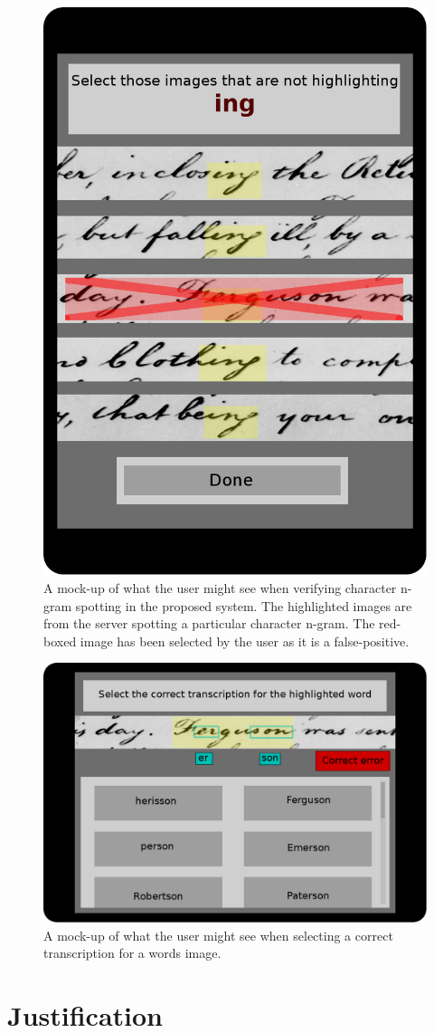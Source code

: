 \documentclass[conference]{IEEEtran}
\begin{document}
\begin{figure}
    \centering
    \includegraphics[width=.25\textwidth]{userTask_spot}
    \caption{A mock-up of what the user might see when verifying character n-gram spotting in the proposed system. The highlighted images are from the server spotting a particular character n-gram. The red-boxed image has been selected by the user as it is a false-positive.}
    \label{fig:userTask_spot}
\end{figure}

\begin{figure}
    \centering
    \includegraphics[width=.35\textwidth]{userTask_trans}
    \caption{A mock-up of what the user might see when selecting a correct transcription for a words image.}
    \label{fig:userTask_trans}
\end{figure}

\section{Justification}
\end{document}
